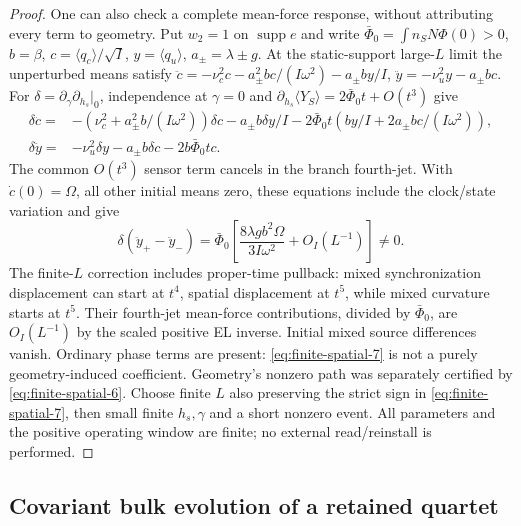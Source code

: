 \documentclass[12pt,a4paper]{article}
\begin{document}
\begin{proof}
One can also check a complete mean-force response, without attributing
every term to geometry. Put $w_2=1$ on $\operatorname{supp}e$ and write
$\bar\Phi_0=\int n_SN\Phi(0)>0$, $b=\beta$, $c=\langle q_c\rangle/\sqrt I$,
$y=\langle q_u\rangle$, $a_\pm=\lambda\pm g$.
At the static-support large-$L$ limit the unperturbed means satisfy
$\ddot c=-\nu_c^2c-a_\pm^2bc/(I\omega^2)-a_\pm by/I$,
$\ddot y=-\nu_u^2y-a_\pm bc$.
For $\delta=\partial_\gamma\partial_{h_s}|_0$, independence at $\gamma=0$
and $\partial_{h_s}\langle Y_S\rangle=2\bar\Phi_0t+O(t^3)$ give
\begin{align*}
 \delta\ddot c={}&-(\nu_c^2+a_\pm^2b/(I\omega^2))\delta c
 -a_\pm b\delta y/I-2\bar\Phi_0t(by/I+2a_\pm bc/(I\omega^2)),\\
 \delta\ddot y={}&-\nu_u^2\delta y-a_\pm b\delta c
                       -2b\bar\Phi_0t c .
\end{align*}
The common $O(t^3)$ sensor term cancels in the branch fourth-jet.
With $\dot c(0)=\Omega$, all other initial means zero, these equations
include the clock/state variation and give
\begin{equation}
 [t^4]\delta(\ddot y_+-\ddot y_-)
 =\bar\Phi_0\left[\frac{8\lambda g b^2\Omega}{3I\omega^2}
                         +O_I(L^{-1})\right]\ne0 .           \label{eq:finite-spatial-7}
\end{equation}
The finite-$L$ correction includes proper-time pullback: mixed
synchronization displacement can start at $t^4$, spatial displacement
at $t^5$, while mixed curvature starts at $t^5$.
Their fourth-jet mean-force contributions, divided by $\bar\Phi_0$,
are $O_I(L^{-1})$ by the scaled positive EL inverse. Initial mixed
source differences vanish. Ordinary phase terms are present: \eqref{eq:finite-spatial-7} is
not a purely geometry-induced coefficient. Geometry's nonzero path
was separately certified by \eqref{eq:finite-spatial-6}.
Choose finite $L$ also preserving the strict sign in \eqref{eq:finite-spatial-7}, then small
finite $h_s,\gamma$ and a short nonzero event. All parameters and the
positive operating window are finite; no external read/reinstall is
performed.
\end{proof}

\subsection{Covariant bulk evolution of a retained quartet}
\label{app:covariant-quartet-bulk}
\end{document}
